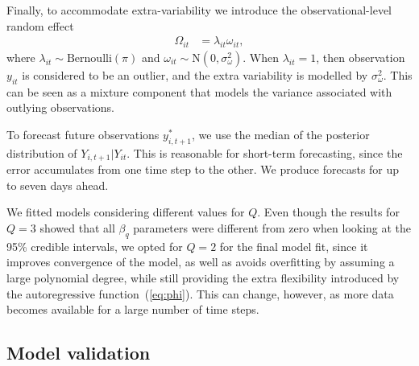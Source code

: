 \documentclass[fleqn,10pt]{wlscirep}
\begin{document}
Finally, to accommodate extra-variability we introduce the observational-level random effect
\begin{align*}
    \Omega_{it} &= \lambda_{it}\omega_{it},
\end{align*}
where $\lambda_{it}\sim\mbox{Bernoulli}(\pi)$ and $\omega_{it}\sim\mbox{N}(0,\sigma^2_{\omega})$. When $\lambda_{it}=1$, then observation $y_{it}$ is considered to be an outlier, and the extra variability is modelled by $\sigma^2_{\omega}$. This can be seen as a mixture component that models the variance associated with outlying observations.

To forecast future observations $y_{i,t+1}^*$, we use the median of the posterior distribution of $Y_{i,t+1}|Y_{it}$. This is reasonable for short-term forecasting, since the error accumulates from one time step to the other. We produce forecasts for up to seven days ahead.

We fitted models considering different values for $Q$. Even though the results for $Q=3$ showed that all $\beta_q$ parameters were different from zero when looking at the 95\% credible intervals, we opted for $Q=2$ for the final model fit, since it improves convergence of the model, as well as avoids overfitting by assuming a large polynomial degree, while still providing the extra flexibility introduced by the autoregressive function~(\ref{eq:phi}). This can change, however, as more data becomes available for a large number of time steps.

\subsection*{Model validation}
\end{document}
